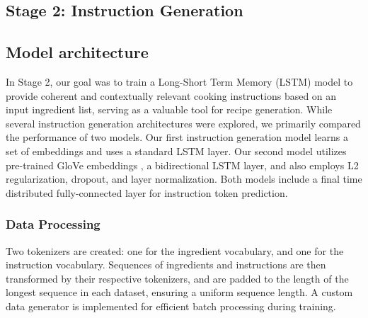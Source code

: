 \documentclass[10pt,twocolumn,letterpaper]{article}
\begin{document}




\subsection{Stage 2: Instruction Generation}

\subsection{Model architecture}
In Stage 2, our goal was to train a Long-Short Term Memory (LSTM) model to provide coherent and contextually relevant cooking instructions based on an input ingredient list, serving as a valuable tool for recipe generation. While several instruction generation architectures were explored, we primarily compared the performance of two models. Our first instruction generation model learns a set of embeddings and uses a standard LSTM layer. Our second model utilizes pre-trained GloVe embeddings \cite{pennington-etal-2014-glove}, a bidirectional LSTM layer, and also employs L2 regularization, dropout, and layer normalization. Both models include a final time distributed fully-connected layer for instruction token prediction.

\subsubsection{Data Processing}
Two tokenizers are created: one for the ingredient vocabulary, and one for the instruction vocabulary. Sequences of ingredients and instructions are then transformed by their respective tokenizers, and are padded to the length of the longest sequence in each dataset, ensuring a uniform sequence length. A custom data generator is implemented for efficient batch processing during training.


\end{document}
